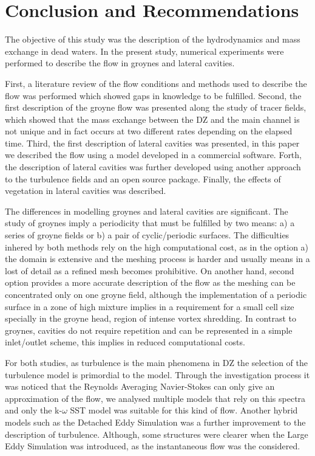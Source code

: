 \chapter{Conclusion and Recommendations}
\label{chap:conclusion}

The objective of this study was the description of the hydrodynamics and mass exchange in dead waters. In the present study, numerical experiments were performed to describe the flow in groynes and lateral cavities.

First, a literature review of the flow conditions and methods used to describe the flow was performed which showed gaps in knowledge to be fulfilled. Second, the first description of the groyne flow was presented along the study of tracer fields, which showed that the mass exchange between the DZ and the main channel is not unique and in fact occurs at two different rates depending on the elapsed time. Third, the first description of lateral cavities was presented, in this paper we described the flow using a model developed in a commercial software. Forth, the description of lateral cavities was further developed using another approach to the turbulence fields and an open source package. Finally, the effects of vegetation in lateral cavities was described.

The differences in modelling groynes and lateral cavities are significant. The study of groynes imply a periodicity that must be fulfilled by two means: a) a series of groyne fields or b) a pair of cyclic/periodic surfaces. The difficulties inhered by both methods rely on the high computational cost, as in the option a) the domain is extensive and the meshing process is harder and usually means in a lost of detail as a refined mesh becomes prohibitive. On another hand, second option provides a more accurate description of the flow as the meshing can be concentrated only on one groyne field, although the implementation of a periodic surface in a zone of high mixture implies in a requirement for a small cell size specially in the groyne head, region of intense vortex shredding. In contrast to groynes, cavities do not require repetition and can be represented in a simple inlet/outlet scheme, this implies in reduced computational costs.

For both studies, as turbulence is the main phenomena in DZ the selection of the turbulence model is primordial to the model. Through the investigation process it was noticed that the Reynolds Averaging Navier-Stokes can only give an approximation of the flow, we analysed multiple models that rely on this spectra and only the k-$\omega$ SST model was suitable for this kind of flow. Another hybrid models such as the Detached Eddy Simulation was a further improvement to the description of turbulence. Although, some structures were clearer when the Large Eddy Simulation was introduced, as the instantaneous flow was the considered.

